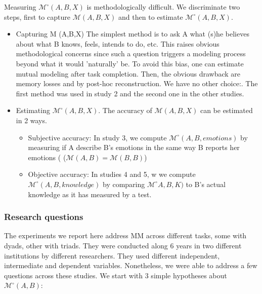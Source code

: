 \documentclass{report}
\begin{document}
Measuring $\mathcal{M}^{\circ}(A,B,X)$ is methodologically difficult. We
discriminate two steps, first to capture $\mathcal{M}(A,B,X)$ and then to
estimate $\mathcal{M}^{\circ}(A,B,X)$. 

\begin{itemize}
    \item Capturing M (A,B,X) The simplest method is to ask A what (s)he
        believes about what B knows, feels, intends to do, etc. This raises
        obvious methodological concerns since such a question triggers a
        modeling process beyond what it would 'naturally' be. To avoid this
        bias, one can estimate mutual modeling after task completion. Then, the
        obvious drawback are memory losses and by post-hoc reconstruction. We
        have no other choice:. The first method was used in study 2 and the
        second one in the other studies.  

    \item Estimating $\mathcal{M}^{\circ}(A,B,X)$. The accuracy of
        $\mathcal{M}(A,B,X)$ can be
        estimated in 2 ways.
        \begin{itemize}
            \item Subjective accuracy: In study 3, we compute
                $\mathcal{M}^{\circ}(A,B,emotions)$ by measuring if A describe
                B's emotions in the same way B reports her emotions (
                ($\mathcal{M}(A,B)=\mathcal{M}(B,B)$) 
                
            \item Objective accuracy: In studies 4 and 5, w we compute
                $\mathcal{M}^{\circ}(A,B,knowledge)$ by comparing
                $\mathcal{M}^{\circ}A,B,K)$ to B's actual knowledge as it has
                measured by a test. 

        \end{itemize}

\end{itemize}

\subsubsection{Research questions}

The experiments we report here address MM across different tasks, some with
dyads, other with triads. They were conducted along 6 years in two different
institutions by different researchers. They used different independent,
intermediate and dependent variables. Nonetheless, we were able to address a few
questions across these studies. We start with 3 simple hypotheses about
$\mathcal{M}^{\circ}(A,B)$:
\end{document}
